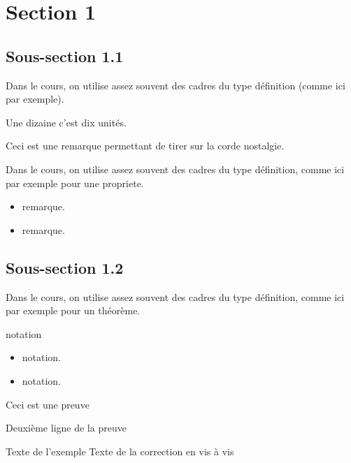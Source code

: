 \section{Section 1}
\subsection{Sous-section 1.1}
\begin{definition}
    Dans le cours, on utilise assez souvent des cadres du type
    définition (comme ici par exemple).

    Une dizaine c'est dix unités.

\end{definition}
\begin{remarque}
    Ceci est une remarque permettant de tirer sur la corde nostalgie.

    \begin{center}
    \end{center}


\end{remarque}
\begin{propriete}
  Dans le cours, on utilise assez souvent des cadres du type
  définition, comme ici par exemple pour une propriete.
\end{propriete}
\begin{remarques}
  \begin{itemize}
    \item remarque.
    \item remarque.
  \end{itemize}
\end{remarques}

\subsection{Sous-section 1.2}
\begin{theoreme}
  Dans le cours, on utilise assez souvent des cadres du type
  définition, comme ici par exemple pour un théorème.
\end{theoreme}
\begin{notation}
  notation
\end{notation}
\begin{notations}
  \begin{itemize}
    \item notation.
    \item notation.
  \end{itemize}
\end{notations}
\begin{preuve}
  Ceci est une preuve\par Deuxième ligne de la preuve
\end{preuve}
\begin{exemple}
  Texte de l’exemple
  \correction
  Texte de la correction en vis à vis
\end{exemple}

